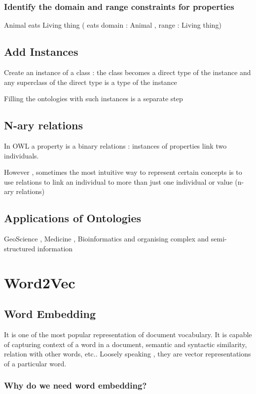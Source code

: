 \documentclass{article}
\begin{document}
\subsubsection{Identify the domain and range constraints for properties}

Animal eats Living thing ( eats domain : Animal , range : Living thing)

\subsection{Add Instances}

Create an instance of a class : the class becomes a direct type of the instance and any superclass of the direct type is a type of the instance

Filling the ontologies with such instances is a separate step

\subsection{N-ary relations}

In OWL a property is a binary relations : instances of properties link two individuals.

However , sometimes the most intuitive way to represent certain concepts is to use relations to link an individual to more than just one individual or value (n-ary relations)

\subsection{Applications of Ontologies}

GeoScience , Medicine , Bioinformatics and organising complex and semi-structured information

\section{Word2Vec}
\subsection{Word Embedding}

It is one of the most popular representation of document vocabulary. It is capable of capturing context of a word in a document, semantic and syntactic similarity, relation with other words, etc..
Loosely speaking , they are vector representations of a particular word.

\subsubsection{Why do we need word embedding?}
\end{document}
